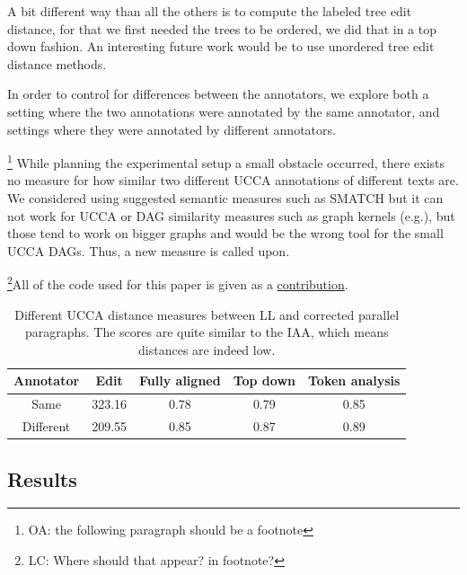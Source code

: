 \documentclass[letter,11pt]{article}
\newcommand{\oa}[1]{\footnote{\color{red}OA: #1}}
\newcommand{\lc}[1]{\footnote{\color{green}LC: #1}}
\begin{document}
A bit different way than all the others is to compute the labeled
tree edit distance\cite{zhang1989simple}, for that we first needed
the trees to be ordered, we did that in a top down fashion. An interesting
future work would be to use unordered tree edit distance methods\cite{zhang1992editing}.









In order to control for differences between the annotators, we explore both
a setting where the two annotations were annotated by the same annotator,
and settings where they were annotated by different annotators.


\oa{the following paragraph should be a footnote}
While planning the experimental setup a small obstacle occurred,
there exists no measure for how similar two different UCCA annotations of different texts are.
We considered using suggested semantic measures
such as SMATCH\cite{cai2013smatch} but it can not work for UCCA or
DAG similarity measures such as graph kernels (e.g.\cite{kashima2003marginalized}),
but those tend to work on bigger graphs and would be the wrong tool
for the small UCCA DAGs. Thus, a new measure is called upon.


\lc{Where should that appear? in footnote?}All of the code used for this paper is given as a \href{link will be disclosed upon publication}{contribution}.
\vspace*{-\baselineskip}
\begin{table}[h!]
	\centering
	\singlespacing
	\begin{tabular}{c|c|c|c|c}
		Annotator & Edit & Fully aligned & Top down & Token analysis
		\\
		\hline
		Same & 323.16 & 0.78 & 0.79 & 0.85
		\\
		Different & 209.55 & 0.85 & 0.87 & 0.89
		\\
		\end{tabular}
		\caption{Different UCCA distance measures between LL and corrected parallel paragraphs. The scores are quite similar to the IAA, which means distances are indeed low.\label{tab:Distances}}
	\end{table}
\vspace*{-\baselineskip}
	\subsection{Results}
	
\end{document}
